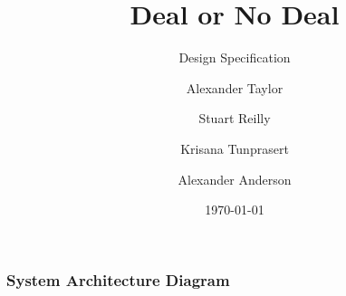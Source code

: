 \documentclass{beamer}
\title{Deal or No Deal}
\subtitle{Design Specification}
\author{Alexander Taylor \and Stuart Reilly \and Krisana Tunprasert \and Alexander Anderson}
\date{\today}
\begin{document}
\frame{\titlepage}

\begin{frame}
	\frametitle{System Architecture Diagram}
	\resizebox{\textwidth}{!}{}
\end{frame}
\end{document}
